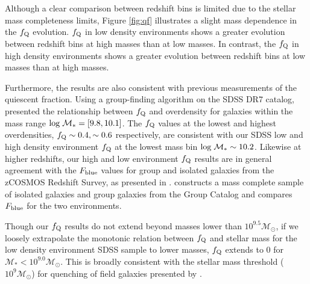 \documentclass{emulateapj}
\begin{document}
Although a clear comparison between redshift bins is limited due to the stellar mass completeness limits, Figure \ref{fig:qf} illustrates a slight mass dependence in the $f_{\rm{Q}}$ evolution. $f_{\rm{Q}}$ in low density environments shows a greater evolution between redshift bins at high masses than at low masses. In contrast, the $f_{\rm{Q}}$ in high density environments shows a greater evolution between redshift bins at low masses than at high masses.




Furthermore, the results are also consistent with previous measurements of the quiescent fraction. Using a group-finding algorithm on the SDSS DR7 catalog, \cite{Tinker:2011aa} presented the relationship between $f_{\rm{Q}}$ and overdensity for galaxies within the mass range $\rm{log} \; \mathcal{M}_{*} = [9.8, 10.1]$. The \cite{Tinker:2011aa} $f_{\rm{Q}}$ values at the lowest and highest overdensities, $f_{\rm{Q}} \sim 0.4, \sim 0.6$ respectively, are consistent with our SDSS low and high density environment $f_{\rm{Q}}$ at the lowest mass bin $\rm{log} \; \mathcal{M}_{*} \sim 10.2$. Likewise at higher redshifts, our high and low environment $f_{\rm{Q}}$ results are in general agreement with the $F_{\rm{blue}}$ values for group and isolated galaxies from the zCOSMOS Redshift Survey, as presented in \cite{Iovino:2010aa}. \cite{Iovino:2010aa} constructs a mass complete sample of isolated galaxies and group galaxies from the \cite{Knobel:2009aa} Group Catalog and compares $F_{\rm{blue}}$ for the two environments. 

Though our $f_{\rm{Q}}$ results do not extend beyond masses lower than $10^{9.5} \mathcal{M}_{\odot}$, if we loosely extrapolate the monotonic relation between $f_{\rm{Q}}$ and stellar mass for the low density environment SDSS sample to lower masses, $f_{\rm{Q}}$ extends to $0$ for $\mathcal{M}_{*} < 10^{9.0} \mathcal{M}_{\odot}$. This is broadly consistent with the stellar mass threshold ($10^9 \mathcal{M}_{\odot}$) for quenching of field galaxies presented by \cite{Geha:2012aa}. 

\end{document}
